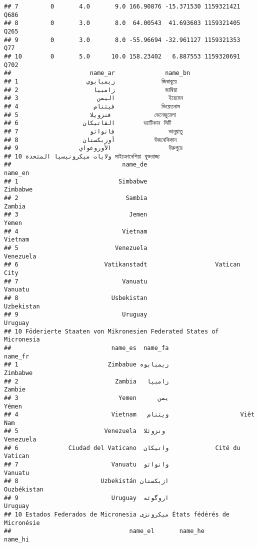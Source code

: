 \documentclass[
]{article}
\begin{document}
\begin{verbatim}
## 7         0       4.0       9.0 166.90876 -15.371530 1159321421       Q686
## 8         0       3.0       8.0  64.00543  41.693603 1159321405       Q265
## 9         0       3.0       8.0 -55.96694 -32.961127 1159321353        Q77
## 10        0       5.0      10.0 158.23402   6.887553 1159320691       Q702
##                      name_ar              name_bn
## 1                   زيمبابوي             জিম্বাবুয়ে
## 2                     زامبيا              জাম্বিয়া
## 3                      اليمن               ইয়েমেন
## 4                     فيتنام             ভিয়েতনাম
## 5                    فنزويلا            ভেনেজুয়েলা
## 6                  الفاتيكان        ভ্যাটিকান সিটি
## 7                    فانواتو               ভানুয়াতু
## 8                  أوزبكستان           উজবেকিস্তান
## 9                 الأوروغواي                উরুগুয়ে
## 10 ولايات ميكرونيسيا المتحدة মাইক্রোনেশিয়া যুক্তরাজ্য
##                               name_de                        name_en
## 1                            Simbabwe                       Zimbabwe
## 2                              Sambia                         Zambia
## 3                               Jemen                          Yemen
## 4                             Vietnam                        Vietnam
## 5                           Venezuela                      Venezuela
## 6                        Vatikanstadt                   Vatican City
## 7                             Vanuatu                        Vanuatu
## 8                          Usbekistan                     Uzbekistan
## 9                             Uruguay                        Uruguay
## 10 Föderierte Staaten von Mikronesien Federated States of Micronesia
##                            name_es  name_fa                     name_fr
## 1                         Zimbabue زیمبابوه                    Zimbabwe
## 2                           Zambia   زامبیا                      Zambie
## 3                            Yemen      یمن                       Yémen
## 4                          Vietnam   ویتنام                    Viêt Nam
## 5                        Venezuela  ونزوئلا                   Venezuela
## 6              Ciudad del Vaticano  واتیکان             Cité du Vatican
## 7                          Vanuatu  وانواتو                     Vanuatu
## 8                       Uzbekistán ازبکستان                 Ouzbékistan
## 9                          Uruguay  اروگوئه                     Uruguay
## 10 Estados Federados de Micronesia میکرونزی États fédérés de Micronésie
##                                 name_el       name_he                  name_hi

\end{verbatim}
\end{document}
